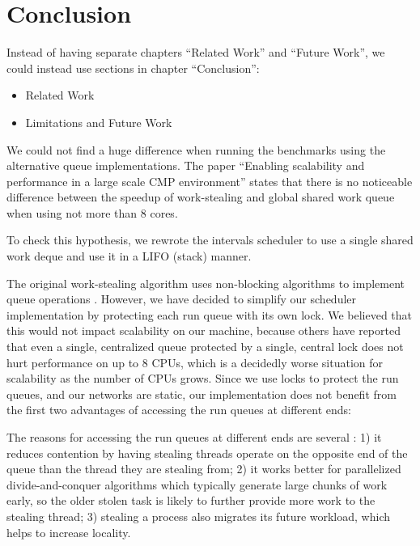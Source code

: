 
\chapter{Conclusion}
\label{chap:queues-conclusion}

Instead of having separate chapters ``Related Work'' and ``Future
Work'', we could instead use sections in chapter ``Conclusion'':

\begin{itemize}
\item Related Work
\item Limitations and Future Work
\end{itemize}


We could not find a huge difference when running the benchmarks using
the alternative queue implementations. The paper ``Enabling
scalability and performance in a large scale CMP environment''
\cite{Saha2007} states that there is no noticeable difference between
the speedup of work-stealing and global shared work queue when using
not more than 8 cores.

To check this hypothesis, we rewrote the intervals scheduler to use a
single shared work deque and use it in a LIFO (stack) manner.


The original work-stealing algorithm uses non-blocking algorithms to
implement queue operations \cite{Arora2001}. However, we have decided
to simplify our scheduler implementation by protecting each run queue
with its own lock. We believed that this would not impact scalability
on our machine, because others \cite{Saha2007} have reported that even
a single, centralized queue protected by a single, central lock does
not hurt performance on up to 8 CPUs, which is a decidedly worse
situation for scalability as the number of CPUs grows. Since we use
locks to protect the run queues, and our networks are static, our
implementation does not benefit from the first two advantages of
accessing the run queues at different ends:

The reasons for accessing the run queues at different ends are several
\cite{Frigo1998}: 1) it reduces contention by having stealing threads
operate on the opposite end of the queue than the thread they are
stealing from; 2) it works better for parallelized divide-and-conquer
algorithms which typically generate large chunks of work early, so the
older stolen task is likely to further provide more work to the
stealing thread; 3) stealing a process also migrates its future
workload, which helps to increase locality.

